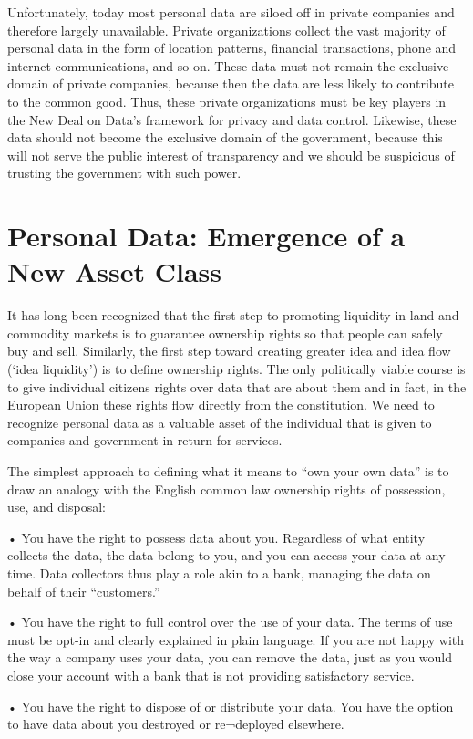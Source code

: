 Unfortunately, today most personal data are siloed off in private companies and therefore largely unavailable.
Private organizations collect the vast majority of personal data in the form of location patterns, financial transactions, phone and internet communications, and so on.
These data must not remain the exclusive domain of private companies, because then the data are less likely to contribute to the common good.
Thus, these private organizations must be key players in the New Deal on Data’s framework for privacy and data control.
Likewise, these data should not become the exclusive domain of the government, because this will not serve the public interest of transparency and we should be suspicious of trusting the government with such power.

\section{Personal Data: Emergence of a New Asset Class}

It has long been recognized that the first step to promoting liquidity in land and commodity markets is to guarantee ownership rights so that people can safely buy and sell.
Similarly, the first step toward creating greater idea and idea flow (`idea liquidity’) is to define ownership rights.
The only politically viable course is to give individual citizens rights over data that are about them and in fact, in the European Union these rights flow directly from the constitution.
We need to recognize personal data as a valuable asset of the individual that is given to companies and government in return for services.

The simplest approach to defining what it means to “own your own data” is to draw an analogy with the English common law ownership rights of possession, use, and disposal:

• You have the right to possess data about you. Regardless of what entity collects the data, the data belong to you, and you can access your data at any time. Data collectors thus play a role akin to a bank, managing the data on behalf of their “customers.”

• You have the right to full control over the use of your data. The terms of use must be opt-in and clearly explained in plain language. If you are not happy with the way a company uses your data, you can remove the data, just as you would close your account with a bank that is not providing satisfactory service.

• You have the right to dispose of or distribute your data. You have the option to have data about you destroyed or re¬deployed elsewhere.

